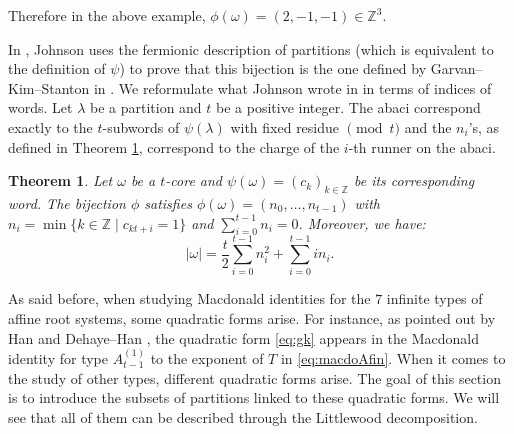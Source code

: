 \documentclass[11pt,letterpaper]{amsart}
\def\bbbz{\mathbb Z}
\newtheorem{thm}[df]{Theorem}
\numberwithin{equation}{section}
\numberwithin{df}{section}
\begin{document}
Therefore in the above example, $\phi(\omega)=(2,-1,-1)\in\bbbz^3$.

In \cite{Johnson}, Johnson uses the fermionic description of partitions (which is equivalent to the definition of $\psi$) to prove that this bijection is the one defined by Garvan--Kim--Stanton in \cite[Bijection $2$]{GKS}. We reformulate what Johnson wrote in \cite[Section 2]{Johnson} in terms of indices of words. Let $\lambda$ be a partition and $t$ be a positive integer. The abaci correspond exactly to the $t$-subwords of $\psi(\lambda)$ with fixed residue $\pmod{t}$ and the $n_i$'s, as defined in Theorem \ref{thm:gk}, correspond to the charge of the $i$-th runner on the abaci.
\begin{thm}\cite[Theorem $2.10$]{Johnson}\cite[Bijection $2$]{GKS}\label{thm:gk}
Let $\omega$ be a $t$-core and $\psi(\omega)=\left(c_k\right)_{k\in\bbbz}$ be its corresponding word. The bijection $\phi$ satisfies $\phi(\omega)=\left(n_0,\dots,n_{t-1}\right)$ with $n_i=\min\lbrace k\in\bbbz \mid c_{kt+i}=1\rbrace$ and $\sum_{i=0}^{t-1} n_i=0$. Moreover, we have:
\begin{equation}\label{eq:gk}
\lvert \omega\rvert =\frac{t}{2}\sum_{i=0}^{t-1}n_i^2+\sum_{i=0}^{t-1}in_i.
\end{equation}

\end{thm}




As said before, when studying Macdonald identities for the $7$ infinite types of affine root systems, some quadratic forms arise. For instance, as pointed out by Han \cite{Ha} and Dehaye--Han \cite{HD}, the quadratic form \eqref{eq:gk} appears in the Macdonald identity for type $A^{(1)}_{t-1}$ to the exponent of $T$ in \eqref{eq:macdoAfin}. When it comes to the study of other types, different quadratic forms arise. The goal of this section is to introduce the subsets of partitions linked to these quadratic forms. We will see that all of them can be described through the Littlewood decomposition.
\end{document}
